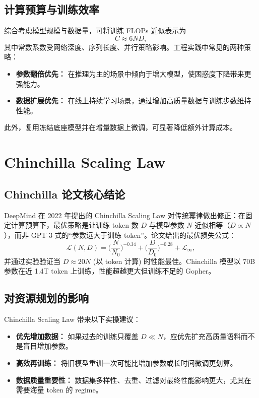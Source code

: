 \documentclass[UTF8,zihao=-4]{ctexart}
\begin{document}
\subsection{计算预算与训练效率}
综合考虑模型规模与数据量，可将训练 FLOPs 近似表示为
\begin{equation}
  C \approx 6 N D,
\end{equation}
其中常数系数受网络深度、序列长度、并行策略影响。工程实践中常见的两种策略：
\begin{itemize}
  \item \textbf{参数翻倍优先：} 在推理为主的场景中倾向于增大模型，使困惑度下降带来更强能力。
  \item \textbf{数据扩展优先：} 在线上持续学习场景，通过增加高质量数据与训练步数维持性能。
\end{itemize}
此外，复用冻结底座模型并在增量数据上微调，可显著降低额外计算成本。

\section{Chinchilla Scaling Law}
\subsection{Chinchilla 论文核心结论}
DeepMind 在 2022 年提出的 Chinchilla Scaling Law 对传统幂律做出修正：在固定计算预算下，最优策略是让训练 token 数 $D$ 与模型参数 $N$ 近似相等（$D \propto N$），而非 GPT-3 式的“参数远大于训练 token”。论文给出的最优损失公式：
\begin{equation}
  \mathcal{L}(N, D) = \bigg(\frac{N}{N_0}\bigg)^{-0.34} + \bigg(\frac{D}{D_0}\bigg)^{-0.28} + \mathcal{L}_\infty,
\end{equation}
并通过实验验证当 $D \approx 20 N$ (以 token 计算) 时性能最佳。Chinchilla 模型以 70B 参数在近 1.4T token 上训练，性能超越更大但训练不足的 Gopher。

\subsection{对资源规划的影响}
Chinchilla Scaling Law 带来以下实操建议：
\begin{itemize}
  \item \textbf{优先增加数据：} 如果过去的训练只覆盖 $D \ll N$，应优先扩充高质量语料而不是盲目增加参数。
  \item \textbf{高效再训练：} 将旧模型重训一次可能比增加参数或长时间微调更划算。
  \item \textbf{数据质量重要性：} 数据集多样性、去重、过滤对最终性能影响更大，尤其在需要海量 token 的 regime。
\end{itemize}
\end{document}
